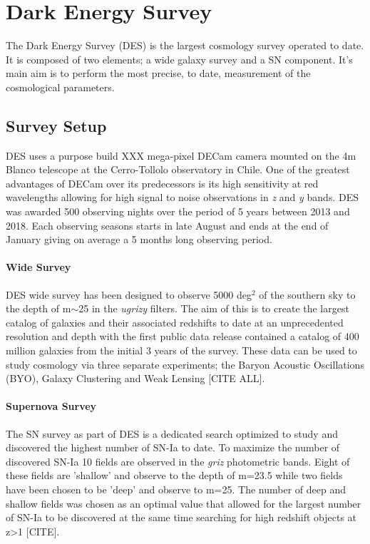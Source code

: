 \section{Dark Energy Survey}
The Dark Energy Survey (DES) is the largest cosmology survey operated to date. It is composed of two elements; a wide galaxy survey and a SN component. It's main aim is to perform the most precise, to date, measurement of the cosmological parameters. 

\subsection{Survey Setup}
DES uses a purpose build XXX mega-pixel DECam camera mounted on the 4m Blanco telescope at the Cerro-Tollolo observatory in Chile. One of the greatest advantages of DECam over its predecessors is its high sensitivity at red wavelengths allowing for high signal to noise observations in \textit{z} and \textit{y} bands. DES was awarded 500 observing nights over the period of 5 years between 2013 and 2018. Each observing seasons starts in late August and ends at the end of January giving on average a 5 months long observing period.   

\paragraph{Wide Survey}
DES wide survey has been designed to observe 5000 deg$^2$ of the southern sky to the depth of m$\sim$25 in the \textit{ugrizy} filters. The aim of this is to create the largest catalog of galaxies and their associated redshifts to date at an unprecedented resolution and depth with the first public data release contained a catalog of 400 million galaxies from the initial 3 years of the survey. These data can be used to study cosmology via three separate experiments; the Baryon Acoustic Oscillations (BYO), Galaxy Clustering and Weak Lensing [CITE ALL]. 

\paragraph{Supernova Survey}
The SN survey as part of DES is a dedicated search optimized to study and discovered the highest number of SN-Ia to date. To maximize the number of discovered SN-Ia 10 fields are observed in the \textit{griz} photometric bands. Eight of these fields are 'shallow' and observe to the depth of m=23.5 while two fields have been chosen to be 'deep' and observe to m=25. The number of deep and shallow fields was chosen as an optimal value that allowed for the largest number of SN-Ia to be discovered at the same time searching for high redshift objects at z>1 [CITE].

